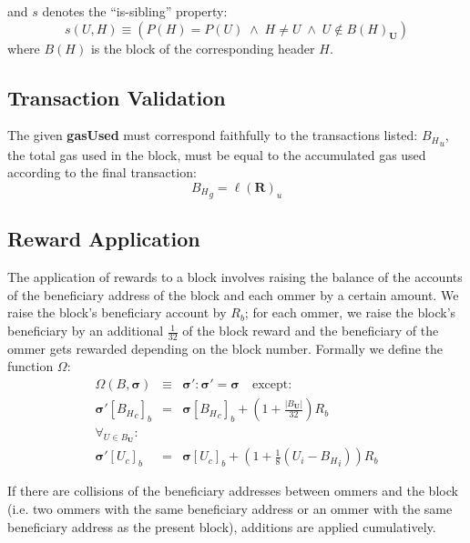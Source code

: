 \documentclass[9pt,oneside]{amsart}
\begin{document}
\begin{multicols}{2}
and $s$ denotes the ``is-sibling'' property:
\begin{equation}
s(U, H) \equiv (P(H) = P(U)\; \wedge \; H \neq U \; \wedge \; U \notin B(H)_\mathbf{U})
\end{equation}
where $B(H)$ is the block of the corresponding header $H$.

\subsection{Transaction Validation}


The given \textbf{gasUsed} must correspond faithfully to the transactions listed: ${B_H}_u$, the total gas used in the block, must be equal to the accumulated gas used according to the final transaction:
\begin{equation}
{B_H}_g = \ell(\mathbf{R})_u
\end{equation}

\subsection{Reward Application}

The application of rewards to a block involves raising the balance of the accounts of the beneficiary address of the block and each ommer by a certain amount. We raise the block's beneficiary account by $R_b$; for each ommer, we raise the block's beneficiary by an additional $\frac{1}{32}$ of the block reward and the beneficiary of the ommer gets rewarded depending on the block number. Formally we define the function $\Omega$:
\begin{eqnarray}
\Omega(B, \boldsymbol{\sigma}) & \equiv & \boldsymbol{\sigma}': \boldsymbol{\sigma}' = \boldsymbol{\sigma} \quad \text{except:} \\
\boldsymbol{\sigma}'[{B_H}_c]_b & = & \boldsymbol{\sigma}[{B_H}_c]_b + (1 + \frac{|B_\mathbf{U}|}{32})R_b \\
\forall_{U \in B_\mathbf{U}}: \\ \nonumber
 \boldsymbol{\sigma}'[U_c]_b & = & \boldsymbol{\sigma}[U_c]_b + (1 + \frac{1}{8} (U_i - {B_H}_i)) R_b 
\end{eqnarray}

If there are collisions of the beneficiary addresses between ommers and the block (i.e. two ommers with the same beneficiary address or an ommer with the same beneficiary address as the present block), additions are applied cumulatively.


\end{multicols}
\end{document}
